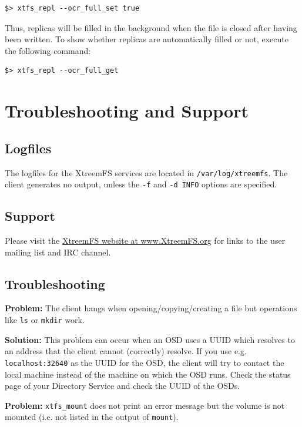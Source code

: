 \documentclass[a4paper,10pt]{book}
\begin{document}
\begin{verbatim}
$> xtfs_repl --ocr_full_set true
\end{verbatim}

Thus, replicas will be filled in the background when the file is closed after having been written. To show whether replicas are automatically filled or not, execute the following command:

\begin{verbatim}
$> xtfs_repl --ocr_full_get
\end{verbatim}

\chapter{Troubleshooting and Support}

\section{Logfiles}

The logfiles for the XtreemFS services are located in \texttt{/var/log/xtreemfs}. The client generates no output, unless the \texttt{-f} and \texttt{-d INFO} options are specified.

\section{Support}
Please visit the \href{http://www.XtreemFS.org}{XtreemFS website at www.XtreemFS.org} for links to the user mailing list and IRC channel.

\section{Troubleshooting}

\textbf{Problem: }The client hangs when opening/copying/creating a file but operations like \texttt{ls} or \texttt{mkdir} work.

\textbf{Solution: }This problem can occur when an OSD uses a UUID which resolves to an address that the client cannot (correctly) resolve. If you use e.g. \texttt{localhost:32640} as the UUID for the OSD, the client will try to contact the local machine instead of the machine on which the OSD runs. Check the status page of your Directory Service and check the UUID of the OSDs.

\textbf{Problem: } \texttt{xtfs\_mount} does not print an error message but the volume is not mounted (i.e. not listed in the output of \texttt{mount}).
\end{document}

